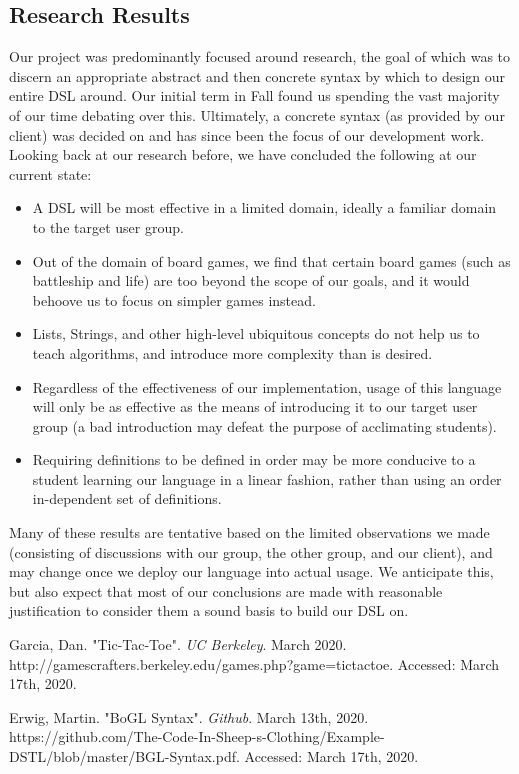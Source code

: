 \documentclass[onecolumn, draftclsnofoot,10pt, compsoc]{IEEEtran}
\begin{document}
\begin{singlespace}
\section{Research Results}

Our project was predominantly focused around research, the goal of which was to discern an appropriate abstract and then concrete syntax by which to design our entire DSL around. Our initial term in Fall found us spending the vast majority of our time debating over this. Ultimately, a concrete syntax (as provided by our client) was decided on and has since been the focus of our development work. Looking back at our research before, we have concluded the following at our current state:
\begin{itemize}
    \item A DSL will be most effective in a limited domain, ideally a familiar domain to the target user group.
    \item Out of the domain of board games, we find that certain board games (such as battleship and life) are too beyond the scope of our goals, and it would behoove us to focus on simpler games instead.
    \item Lists, Strings, and other high-level ubiquitous concepts do not help us to teach algorithms, and introduce more complexity than is desired.
    \item Regardless of the effectiveness of our implementation, usage of this language will only be as effective as the means of introducing it to our target user group (a bad introduction may defeat the purpose of acclimating students).
    \item Requiring definitions to be defined in order may be more conducive to a student learning our language in a linear fashion, rather than using an order in-dependent set of definitions.
\end{itemize}

Many of these results are tentative based on the limited observations we made (consisting of discussions with our group, the other group, and our client), and may change once we deploy our language into actual usage. We anticipate this, but also expect that most of our conclusions are made with reasonable justification to consider them a sound basis to build our DSL on.

\begin{thebibliography}{20}
Garcia, Dan. "Tic-Tac-Toe". \textit{UC Berkeley}. March 2020. http://gamescrafters.berkeley.edu/games.php?game=tictactoe. Accessed: March 17th, 2020.

Erwig, Martin. "BoGL Syntax". \textit{Github}. March 13th, 2020. https://github.com/The-Code-In-Sheep-s-Clothing/Example-DSTL/blob/master/BGL-Syntax.pdf. Accessed: March 17th, 2020.

\end{thebibliography}

\end{singlespace}
\end{document}
